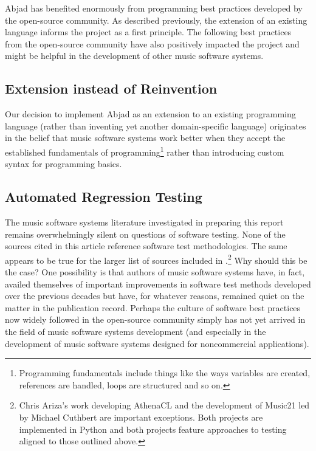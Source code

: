 \documentclass{article}
\begin{document}
Abjad has benefited enormously from programming best practices developed by the
open-source community. As described previously, the extension of an existing
language informs the project as a first principle. The following best practices
from the open-source community have also positively impacted the project and
might be helpful in the development of other music software systems.

\subsection{Extension instead of Reinvention}

Our decision to implement Abjad as an extension to an existing
programming language (rather than inventing yet another domain-specific
language) originates in the belief that music software systems work better when
they accept the established fundamentals of programming\footnote{Programming
fundamentals include things like the ways variables are created, references are
handled, loops are structured and so on.} rather than introducing custom syntax
for programming basics.

\subsection{Automated Regression Testing}

The music software systems literature investigated in preparing this report
remains overwhelmingly silent on questions of software testing. None of the
sources cited in this article reference software test methodologies. The same
appears to be true for the larger list of sources included in
\cite{trevino2013compositional}.\footnote{Chris Ariza's work developing
AthenaCL \cite{Ariza2005} and the development of Music21 \cite{Ariza2010} led
by Michael Cuthbert are important exceptions. Both projects are implemented in
Python and both projects feature approaches to testing aligned to those
outlined above.} Why should this be the case? One possibility is that authors
of music software systems have, in fact, availed themselves of important
improvements in software test methods developed over the previous decades but
have, for whatever reasons, remained quiet on the matter in the publication
record. Perhaps the culture of software best practices now widely followed in
the open-source community simply has not yet arrived in the field of music
software systems development (and especially in the development of music
software systems designed for noncommercial applications).
\end{document}
